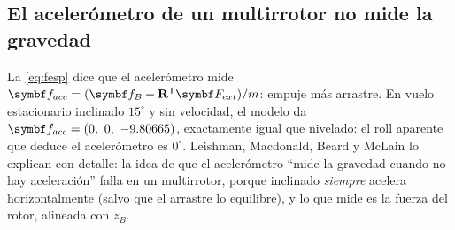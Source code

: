 \subsection{El acelerómetro de un multirrotor no mide la gravedad}
\label{sec:leishman}

La \eqref{eq:fesp} dice que el acelerómetro mide
$\vect f_{acc}=(\vect f_B+\R\T\vect F_{ext})/m$: empuje más arrastre. En
vuelo estacionario inclinado $15^\circ$ y sin velocidad, el modelo da
$\vect f_{acc}=(0,\ 0,\ -9.80665)$, exactamente igual que nivelado: el roll
aparente que deduce el acelerómetro es $0^\circ$. Leishman, Macdonald, Beard
y McLain \cite{leishman14} lo explican con detalle: la idea de que el
acelerómetro ``mide la gravedad cuando no hay aceleración'' falla en un
multirrotor, porque inclinado \emph{siempre} acelera horizontalmente (salvo
que el arrastre lo equilibre), y lo que mide es la fuerza del rotor, alineada
con $z_B$.

